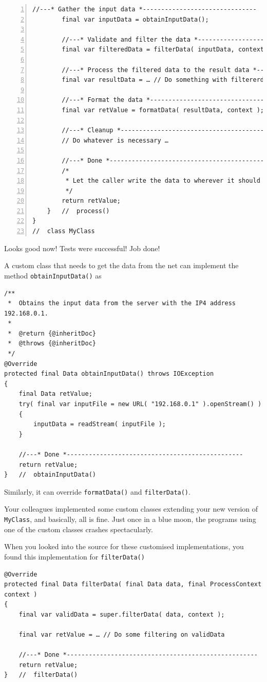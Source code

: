 \documentclass[11pt,a4paper, titlepage, parskip=half, headsepline, footsepline, cleardoublepage=current, headheight=1cm]{scrbook}
\begin{document}
\begin{lstlisting}[numbers=left]
        //---* Gather the input data *-------------------------------
        final var inputData = obtainInputData();
        
        //---* Validate and filter the data *------------------------
        final var filteredData = filterData( inputData, context );
        
        //---* Process the filtered data to the result data *--------
        final var resultData = … // Do something with filtererdData
        
        //---* Format the data *-------------------------------------
        final var retValue = formatData( resultData, context );
        
        //---* Cleanup *---------------------------------------------
        // Do whatever is necessary …
        
        //---* Done *------------------------------------------------
        /*
         * Let the caller write the data to wherever it should end up.
         */
        return retValue; 
    }   //  process()
}
//  class MyClass
\end{lstlisting}

Looks good now! Tests were successful! Job done!

A custom class that needs to get the data from the net can implement the method \lstinline|obtainInputData()| as
\begin{lstlisting}
/**
 *  Obtains the input data from the server with the IP4 address 192.168.0.1.
 *
 *  @return {@inheritDoc}
 *  @throws {@inheritDoc}
 */
@Override
protected final Data obtainInputData() throws IOException
{
    final Data retValue;
    try( final var inputFile = new URL( "192.168.0.1" ).openStream() )
    {
        inputData = readStream( inputFile );
    }
        
    //---* Done *------------------------------------------------
    return retValue;
}   //  obtainInputData()
\end{lstlisting}
Similarly, it can override \lstinline|formatData()| and \lstinline|filterData()|.

Your colleagues implemented some custom classes extending your new version of \lstinline|MyClass|, and basically, all is fine. Just once in a blue moon, the programs using one of the custom classes crashes spectacularly.

When you looked into the source for these customised implementations, you found this implementation for \lstinline|filterData()|
\begin{lstlisting}
@Override
protected final Data filterData( final Data data, final ProcessContext context )
{
    final var validData = super.filterData( data, context );
    
    final var retValue = … // Do some filtering on validData
        
    //---* Done *----------------------------------------------------
    return retValue;
}   //  filterData()
\end{lstlisting}
\end{document}
